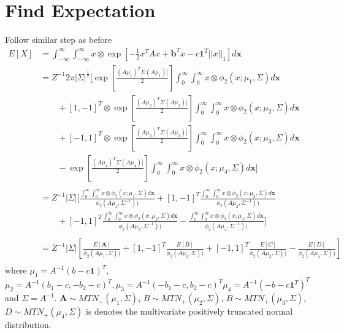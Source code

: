 \documentclass[]{article}
\begin{document}
\newpage

\section{Find Expectation}
Follow similar step as before
$$
\begin{array}{rl}
	E[X] 
	& = \int_{-\infty}^\infty \int_{-\infty}^\infty x \otimes \exp\left[ -\frac{1}{2}x^TAx + \textbf{b}^Tx - c\textbf{1}^T||x||_1 \right] d\textbf{x}\\ [2ex]
	& 
	= Z^{-1} 2\pi|\Sigma|^{\frac{1}{2}}[\exp\left[ \frac{(A\mu_1)^T\Sigma(A\mu_1)]}{2} \right] \int_0^\infty\int_0^\infty x\otimes\phi_2(x;\mu_1,\Sigma)d\textbf{x}\\
	& \qquad	
	+ [1,-1]^T\otimes \exp\left[ \frac{(A\mu_2)^T\Sigma(A\mu_2)]}{2} \right] \int_0^\infty\int_0^\infty x\otimes\phi_2(x;\mu_2,\Sigma)d\textbf{x}\\
	& \qquad
	+ [-1,1]^T \otimes  \exp\left[ \frac{(A\mu_3)^T\Sigma(A\mu_3)]}{2} \right] \int_0^\infty\int_0^\infty x\otimes\phi_2(x;\mu_3,\Sigma)d\textbf{x}\\
	& \qquad	
	-  \exp\left[ \frac{(A\mu_4)^T\Sigma(A\mu_4)]}{2} \right] \int_0^\infty\int_0^\infty x\otimes\phi_2(x;\mu_4,\Sigma)d\textbf{x}]\\
	\\
	&
	=  Z^{-1}|\Sigma|[ \frac{\int_0^\infty\int_0^\infty x\otimes\phi_2(x;\mu_1,\Sigma)d\textbf{x}}{\phi_2(A\mu_1,\Sigma^{-1}))}

	+ [1,-1]^T  \frac{\int_0^\infty\int_0^\infty x\otimes\phi_2(x;\mu_2,\Sigma)d\textbf{x}}{\phi_2(A\mu_2,\Sigma^{-1}))}\\
	& \qquad
	+ [-1,1]^T   \frac{\int_0^\infty\int_0^\infty x\otimes\phi_2(x;\mu_3,\Sigma)d\textbf{x}}{\phi_2(A\mu_3,\Sigma^{-1}))}
	
	-  \frac{\int_0^\infty\int_0^\infty x\otimes\phi_2(x;\mu_4,\Sigma)d\textbf{x}}{\phi_2(A\mu_4,\Sigma^{-1}))}]\\
	\\
	&
	=  Z^{-1}|\Sigma|[ \frac{E[\textbf{A}]}{\phi_2(A\mu_1,\Sigma))}

	+ [1,-1]^T  \frac{E[B]}{\phi_2(A\mu_2,\Sigma))}

	+ [-1,1]^T   \frac{E[C]}{\phi_2(A\mu_3,\Sigma))}
	
	-  \frac{E[D]}{\phi_2(A\mu_4,\Sigma))}]\\
	
	
\end{array}
$$
\noindent where $\mu_1 = A^{-1}(b-c\textbf{1})^T$, $\mu_2 = A^{-1}(b_1-c,-b_2-c)^T, \mu_3 = A^{-1}(-b_1-c,b_2-c)^T \mu_4 = A^{-1}(-b-c \textbf{1}^T)^T $ and $\Sigma = A^{-1}$.
\noindent $\textbf{A}\sim MTN_+(\mu_1,\Sigma)$, $B\sim MTN_+(\mu_2,\Sigma)$, $B\sim MTN_+(\mu_3,\Sigma)$, $D\sim MTN_+(\mu_4,\Sigma)$ is denotes the multivariate positively truncated normal distribution.
\end{document}
